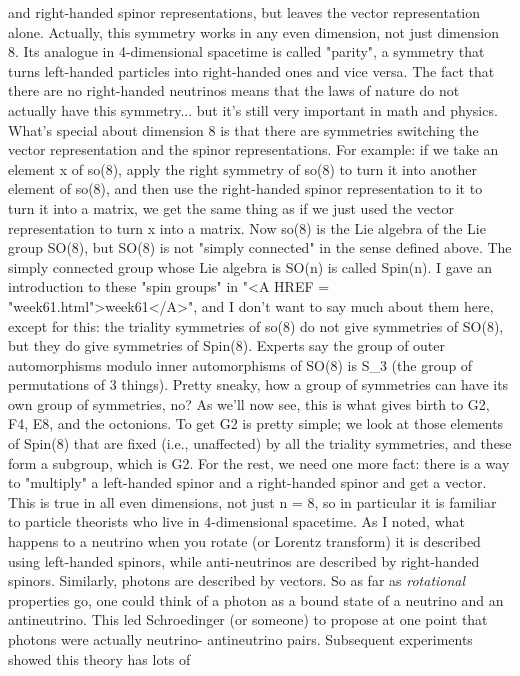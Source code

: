 and right-handed spinor representations, but leaves the vector 
representation alone.  Actually, this symmetry works in any even
dimension, not just dimension 8.  Its analogue in 4-dimensional spacetime
is called "parity", a symmetry that turns left-handed particles
into right-handed ones and vice versa.  The fact that there are
no right-handed neutrinos means that the laws of nature do not actually have
this symmetry... but it's still very important in math and physics.
What's special about dimension 8 is that there are symmetries switching
the vector representation and the spinor representations.  For example:
if we take an element x of so(8), apply the right symmetry of so(8) to turn it 
into another element of so(8), and then use the right-handed spinor
representation to it to turn it into a matrix, we get the same thing as if 
we just used the vector representation to turn x into a matrix.
Now so(8) is the Lie algebra of the Lie group SO(8), but SO(8) is
not "simply connected" in the sense defined above.  The simply connected
group whose Lie algebra is SO(n) is called Spin(n).  I gave an introduction
to these "spin groups" in "<A HREF = "week61.html">week61</A>", and I don't want to say much about
them here, except for this: the triality symmetries of so(8) do not
give symmetries of SO(8), but they do give symmetries of Spin(8).  
Experts say the group of outer automorphisms modulo inner automorphisms 
of SO(8) is S_3 (the group of permutations of 3 things).
Pretty sneaky, how a group of symmetries can have its own group of 
symmetries, no?  As we'll now see, this is what gives birth to 
G2, F4, E8, and the octonions.
To get G2 is pretty simple; we look at those elements of Spin(8) that
are fixed (i.e., unaffected) by all the triality symmetries, and these
form a subgroup, which is G2.   
For the rest, we need one more fact: there is a way to "multiply" a 
left-handed spinor and a right-handed spinor and get a vector.  This is true 
in all even dimensions, not just n = 8, so in particular it is familiar to
particle theorists who live in 4-dimensional spacetime.   As I noted, 
what happens to a neutrino when you rotate (or Lorentz transform) it
is described using left-handed spinors, while anti-neutrinos are described
by right-handed spinors.  Similarly, photons are described by vectors.  
So as far as \emph{rotational} properties go, one could think of a photon as
a bound state of a neutrino and an antineutrino.  This led Schroedinger 
(or someone) to propose at one point that photons were actually neutrino-
antineutrino pairs.  Subsequent experiments showed this theory has lots of 
